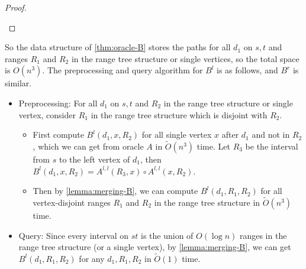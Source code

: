 \documentclass[11pt]{article}
\theoremstyle{plain}
\theoremstyle{definition}
\newcommand{\too}[1]{\tilde{O}({#1})}
\newcommand{\zdd}[1]{{#1}^{l}}
\begin{document}
\begin{proof}
\begin{center}
     \end{center}

\end{proof}

So the data structure of \cref{thm:oracle-B} stores the paths for all $d_1$ on $s,t$ and ranges $R_1$ and $R_2$ in the range tree structure or single vertices, so the total space is $O(n^3)$. The preprocessing and query algorithm for $B^l$ is as follows, and $B^r$ is similar.
\begin{itemize}
    \item Preprocessing: For all $d_1$ on $s,t$ and $R_2$ in the range tree structure or single vertex, consider $R_1$ in the range tree structure which is disjoint with $R_2$.
    \begin{itemize}
        \item First compute $B^l(d_1,x,R_2)$ for all single vertex $x$ after $d_1$ and not in $R_2$, which we can get from oracle $A$ in $\too{n^3}$ time. Let $R_3$ be the interval from $s$ to the left vertex of $d_1$, then $B^l(d_1,x,R_2)=A^{l,l}(R_3,x)\circ A^{l,l}(x,R_2)$.
        \item Then by \cref{lemma:merging-B}, we can compute $B^l(d_1,R_1,R_2)$ for all vertex-disjoint ranges $R_1$ and $R_2$ in the range tree structure in $\too{n^3}$ time.
    \end{itemize}
    \item Query: Since every interval on $st$ is the union of $O(\log n)$ ranges in the range tree structure (or a single vertex), by \cref{lemma:merging-B}, we can get $B^l(d_1,R_1,R_2)$ for any $d_1,R_1,R_2$ in $\too{1}$ time.
\end{itemize}
\end{document}
